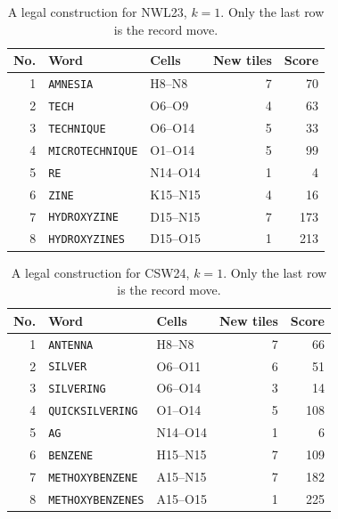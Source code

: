 \begin{table}[!ht]\centering\small
\caption{A legal construction for NWL23, $k=1$. Only the last row is the record move.}
\label{tab:NWL23-1-history}
\begin{tabular}{@{}rllrr@{}}\toprule
No. & Word & Cells & New tiles & Score\\\midrule
1 & \texttt{AMNESIA} & H8--N8 & 7 & 70\\
2 & \texttt{TECH} & O6--O9 & 4 & 63\\
3 & \texttt{TECHNIQUE} & O6--O14 & 5 & 33\\
4 & \texttt{MICROTECHNIQUE} & O1--O14 & 5 & 99\\
5 & \texttt{RE} & N14--O14 & 1 & 4\\
6 & \texttt{ZINE} & K15--N15 & 4 & 16\\
7 & \texttt{HYDROXYZINE} & D15--N15 & 7 & 173\\
\midrule
8 & \texttt{HYDROXYZINES} & D15--O15 & 1 & 213\\
\bottomrule\end{tabular}
\end{table}

\begin{table}[!ht]\centering\small
\caption{A legal construction for CSW24, $k=1$. Only the last row is the record move.}
\label{tab:CSW24-1-history}
\begin{tabular}{@{}rllrr@{}}\toprule
No. & Word & Cells & New tiles & Score\\\midrule
1 & \texttt{ANTENNA} & H8--N8 & 7 & 66\\
2 & \texttt{SILVER} & O6--O11 & 6 & 51\\
3 & \texttt{SILVERING} & O6--O14 & 3 & 14\\
4 & \texttt{QUICKSILVERING} & O1--O14 & 5 & 108\\
5 & \texttt{AG} & N14--O14 & 1 & 6\\
6 & \texttt{BENZENE} & H15--N15 & 7 & 109\\
7 & \texttt{METHOXYBENZENE} & A15--N15 & 7 & 182\\
\midrule
8 & \texttt{METHOXYBENZENES} & A15--O15 & 1 & 225\\
\bottomrule\end{tabular}
\end{table}

